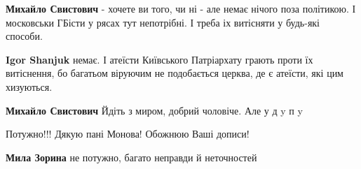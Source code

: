\begin{itemize}
\begin{itemize}
 
\textbf{Михайло Свистович} - хочете ви того, чи ні - але немає нічого поза політикою. І московськи ГБісти у рясах тут непотрібні. І треба іх витісняти у будь-які способи.

 
\textbf{Igor Shanjuk} немає. І атеїсти Київського Патріархату грають проти їх витіснення, бо багатьом віруючим не подобається церква, де є атеїсти, які цим хизуються.

 
\textbf{Михайло Свистович} Йдіть з миром, добрий чоловіче.
Але у
д
y
п
y
\end{itemize}

 
Потужно!!! Дякую пані Монова! Обожнюю Ваші дописи!

\begin{itemize}
 
\textbf{Мила Зорина} не потужно, багато неправди й неточностей
\end{itemize}

 

\end{itemize}
